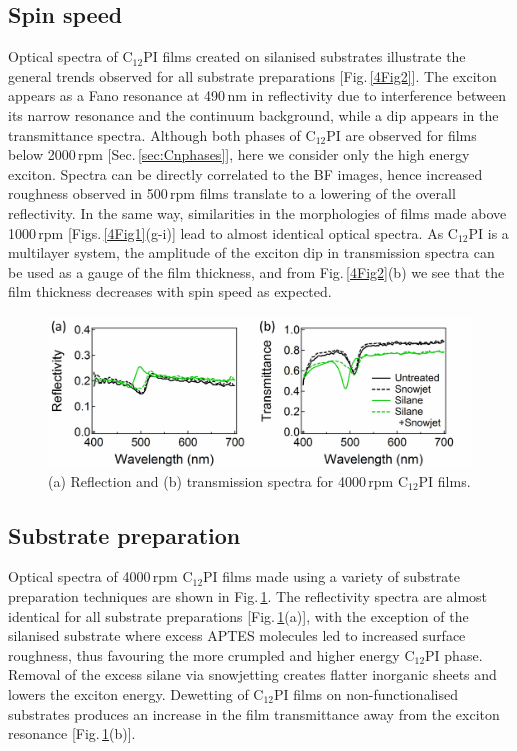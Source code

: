 \subsection{Spin speed}
Optical spectra of C$_{12}$PI films created on silanised substrates illustrate the general trends observed for all substrate preparations [Fig.\,\ref{4Fig2}]. The exciton appears as a Fano resonance at 490\,nm in reflectivity due to interference between its narrow resonance and the continuum background, while a dip appears in the transmittance spectra. Although both phases of C$_{12}$PI are observed for films below 2000\,rpm [Sec.\,\ref{sec:Cnphases}], here we consider only the high energy exciton. Spectra can be directly correlated to the BF images, hence increased roughness observed in 500\,rpm films translate to a lowering of the overall reflectivity. In the same way, similarities in the morphologies of films made above 1000\,rpm [Figs.\,\ref{4Fig1}(g-i)] lead to almost identical optical spectra. As C$_{12}$PI is a multilayer system, the amplitude of the exciton dip in transmission spectra can be used as a gauge of the film thickness, and from Fig.\,\ref{4Fig2}(b) we see that the film thickness decreases with spin speed as expected.

\begin{figure}[h!]
\centering
\includegraphics[width=\textwidth]{Fig3}
\caption{(a) Reflection and (b) transmission spectra for 4000\,rpm C$_{12}$PI films.}
\label{4Fig3}
\end{figure}
\subsection{Substrate preparation}
Optical spectra of 4000\,rpm C$_{12}$PI films made using a variety of substrate preparation techniques are shown in Fig.\,\ref{4Fig3}. The reflectivity spectra are almost identical for all substrate preparations [Fig.\,\ref{4Fig3}(a)], with the exception of the silanised substrate where excess APTES molecules led to increased surface roughness, thus favouring the more crumpled and higher energy C$_{12}$PI phase. Removal of the excess silane via snowjetting creates flatter inorganic sheets and lowers the exciton energy. Dewetting of C$_{12}$PI films on non-functionalised substrates produces an increase in the film transmittance away from the exciton resonance [Fig.\,\ref{4Fig3}(b)].


